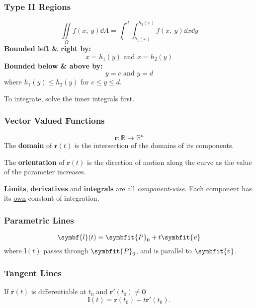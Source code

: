 \documentclass{article}
\begin{document}
\begin{multicols}{3}
    \subsubsection*{Type II Regions}
    \begin{equation*}
        \iint\limits_{\Omega} f(x,\: y) \dd{A} = \int_c^d\int_{h_1(x)}^{h_2(x)} f(x,\: y) \dd{x} \dd{y}
    \end{equation*}
    \textbf{Bounded left \& right by:}
    \begin{equation*}
        x=h_1(y) \text{ and } x=h_2(y)
    \end{equation*}
    \textbf{Bounded below \& above by:}
    \begin{equation*}
        y=c \text{ and } y=d
    \end{equation*}
    where $h_1(y) \leq h_2(y)$ for $c \leq y \leq d$.

    To integrate, solve the inner integrals first.
    \subsubsection*{Vector Valued Functions}
    \begin{equation*}
        \symbf{r}:\mathbb{R} \to \mathbb{R}^n
    \end{equation*}
    The \textbf{domain} of $\symbf{r}(t)$ is the intersection of the domains
    of its components.

    The \textbf{orientation} of $\symbf{r}(t)$ is the direction of motion along the
    curve as the value of the parameter increases.

    \textbf{Limits}, \textbf{derivatives} and \textbf{integrals} are all \textit{component-wise}. Each component has its \underline{own} constant of integration.
    \subsubsection*{Parametric Lines}
    \begin{equation*}
        \symbf{l}(t) = \symbfit{P}_0 + t\symbfit{v}
    \end{equation*}
    where $\symbf{l}(t)$ passes through $\symbfit{P}_0$, and is parallel to $\symbfit{v}$.
    \subsubsection*{Tangent Lines}
    If $\symbf{r}(t)$ is differentiable at
    $t_0$ and $\symbf{r'}(t_0)\ne\symbf{0}$
    \begin{equation*}
        \symbf{l}(t) = \symbf{r}(t_0)+t\symbf{r'}(t_0).
    \end{equation*}

\end{multicols}
\end{document}
